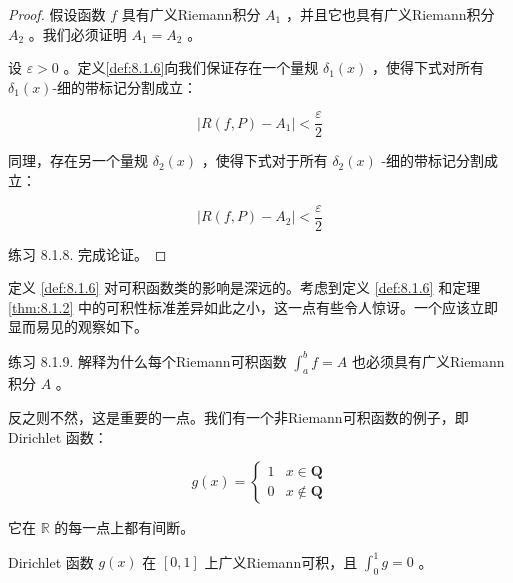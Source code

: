 \begin{proof}
假设函数 \(f\) 具有广义Riemann积分 \({A}_{1}\) ，并且它也具有广义Riemann积分 \({A}_{2}\) 。我们必须证明 \({A}_{1} = {A}_{2}\) 。

设 \(\varepsilon  > 0\) 。定义\ref{def:8.1.6}向我们保证存在一个量规 \({\delta }_{1}\left( x\right)\) ，使得下式对所有 $\delta_1(x)$-细的带标记分割成立：

\[
\left| {R\left( {f,P}\right)  - {A}_{1}}\right|  < \frac{\varepsilon }{2}
\]

同理，存在另一个量规 \({\delta }_{2}\left( x\right)\) ，使得下式对于所有 \({\delta }_{2}\left( x\right)\) -细的带标记分割成立：

\[
\left| {R\left( {f,P}\right)  - {A}_{2}}\right|  < \frac{\varepsilon }{2}
\]

练习 8.1.8. 完成论证。
\end{proof}


定义 \ref{def:8.1.6} 对可积函数类的影响是深远的。考虑到定义 \ref{def:8.1.6} 和定理 \ref{thm:8.1.2} 中的可积性标准差异如此之小，这一点有些令人惊讶。一个应该立即显而易见的观察如下。

练习 8.1.9. 解释为什么每个Riemann可积函数 \({\int }_{a}^{b}f = A\) 也必须具有广义Riemann积分 \(A\) 。

反之则不然，这是重要的一点。我们有一个非Riemann可积函数的例子，即 Dirichlet 函数：

\[
g\left( x\right)  = \left\{  \begin{array}{ll} 1 & x \in  \mathbf{Q} \\  0 & x \notin  \mathbf{Q} \end{array}\right.
\]

它在 \(\mathbb{R}\) 的每一点上都有间断。

\begin{Thm}
  \label{thm:8.1.8}
  Dirichlet 函数 \(g\left( x\right)\) 在 \(\left\lbrack  {0,1}\right\rbrack\) 上广义Riemann可积，且 \({\int }_{0}^{1}g = 0\) 。
\end{Thm}

